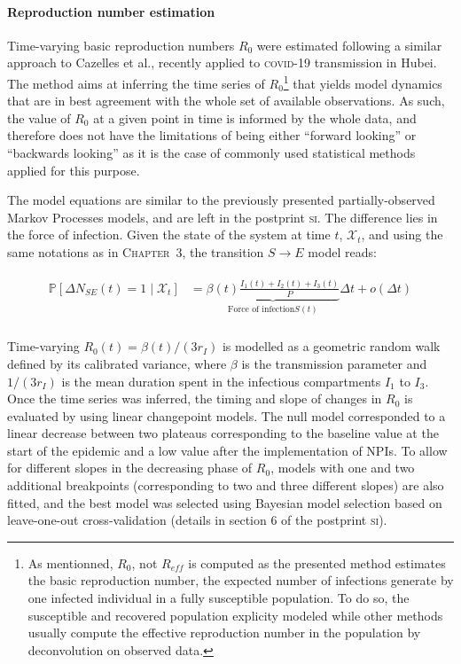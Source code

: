  \paragraph{Reproduction number estimation} Time-varying basic reproduction numbers $R_0$ were estimated following a similar approach to Cazelles et al.\cite{Cazelles:AccountingNonstationarityEpidemiology:2018}, recently applied to \textsc{covid}-19 transmission in Hubei\cite{Kucharski:EarlyDynamicsTransmission:2020}. The method aims at inferring the time series of $R_0$\footnote{As mentionned, $R_0$, not $R_{eff}$ is computed as the presented method estimates the basic reproduction number, \ie the expected number of infections generate by one infected individual in a fully susceptible population. To do so, the susceptible and recovered population explicity modeled while other methods usually compute the effective reproduction number in the population by deconvolution on observed data.} that yields model dynamics that are in best agreement with the whole set of available observations. As such, the value of $R_0$ at a given point in time is informed by the whole data, and therefore does not have the limitations of being either “forward looking” or “backwards looking” as it is the case of commonly used statistical methods applied for this purpose\cite{Wallinga:DifferentEpidemicCurves:2004,Cori:NewFrameworkSoftware:2013,Lipsitch:CommentPanLiu:2020}. 
 
The model equations are similar to the previously presented partially-observed Markov Processes models, and are left in the postprint \textsc{si}. The difference lies in the force of infection. Given the state of the system at time \(t\), \(\mathcal{X}_t\), and using the same notations as in \textsc{Chapter~3}, the transition $S \longrightarrow E$ model reads:

\begin{gather}
\begin{aligned}
    \mathbb{P}\left[ \Delta N_{SE}(t) = 1 \mid\mathcal{X}_t\right] &=  \underbrace{\beta(t)  \frac{I_1(t) + I_2(t) + I_3(t)}{P}}_{\text{Force of infection} S(t)} \Delta t + o(\Delta t)\\
    \end{aligned}
\end{gather}

Time-varying $R_0(t) = \beta(t)/(3r_I)$ is modelled as a geometric random walk defined by its calibrated variance, where $\beta$ is the transmission parameter and $1/(3r_I)$ is the mean duration spent in the infectious compartments $I_1$ to $I_3$. Once the time series was inferred, the timing and slope of changes in $R_0$ is evaluated by using linear changepoint models\cite{Lindelov:McpPackageRegression:2020}. The null model corresponded to a linear decrease between two plateaus corresponding to the baseline value at the start of the epidemic and a low value after the implementation of NPIs. To allow for different slopes in the decreasing phase of $R_0$, models with one and two additional breakpoints (corresponding to two and three different slopes) are also fitted, and the best model was selected using Bayesian model selection based on leave-one-out cross-validation (details in section 6 of the postprint \textsc{si}). 

